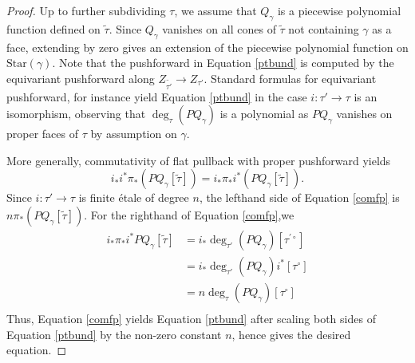 \documentclass[12pt, oneside]{amsart}   	%
\numberwithin{equation}{section}
\numberwithin{thm}{section}
\numberwithin{figure}{section}
\begin{document}
\begin{proof}
Up to further subdividing $\tau$, we assume that $Q_{\gamma}$ is a piecewise polynomial function defined on $\tilde{\tau}$. Since $Q_{\gamma}$ vanishes on all cones of $\tilde{\tau}$ not containing $\gamma$ as a face, extending by zero gives an extension of the piecewise polynomial function on $\text{Star}(\gamma)$. Note that the pushforward in Equation \ref{ptbund} is computed by the equivariant pushforward along $Z_{\tilde{\tau'}} \rightarrow Z_{\tau'}$. Standard formulas for equivariant pushforward, for instance \cite[Proposition $1.1$]{PPM} yield Equation \ref{ptbund} in the case $i: \tau' \rightarrow \tau$ is an isomorphism, observing that $\deg_{\tau}(PQ_{\gamma})$ is a polynomial as $PQ_{\gamma}$ vanishes on proper faces of $\tau$ by assumption on $\gamma$. 

More generally, commutativity of flat pullback with proper pushforward yields 
\begin{equation}\label{comfp}
i_*i^*\pi_*(PQ_{\gamma}[\tilde{\tau}]) = i_*\pi_*i^*(PQ_{\gamma}[\tilde{\tau}]).
\end{equation}
 Since $i: \tau' \rightarrow \tau$ is finite \'etale of degree $n$, the lefthand side of Equation \ref{comfp} is $n\pi_*(PQ_{\gamma}[\tilde{\tau}])$. For the righthand of Equation \ref{comfp},we %
 \begin{equation}
\begin{split}
i_*\pi_*i^*PQ_{\gamma}[\tilde{\tau}] &= i_*\deg_{\tau'}(PQ_{\gamma})[\tau^{'\circ}] \\
&= i_*\deg_{\tau'}(PQ_{\gamma})i^*[\tau^{\circ}]\\
&= n\deg_{\tau}(PQ_{\gamma})[\tau^\circ]\\
\end{split}
\end{equation}
Thus, Equation \ref{comfp} yields Equation \ref{ptbund} after scaling both sides of Equation \ref{ptbund} by the non-zero constant $n$, hence gives the desired equation. 
\end{proof}


\end{document}
